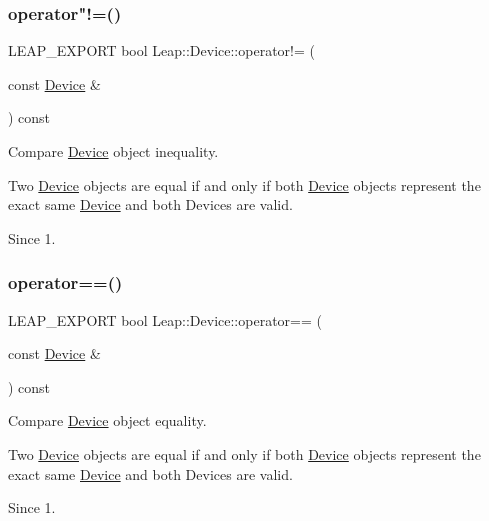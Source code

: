 \subsubsection{\texorpdfstring{operator"!=()}{operator!=()}}
{\footnotesize\ttfamily L\+E\+A\+P\+\_\+\+E\+X\+P\+O\+RT bool Leap\+::\+Device\+::operator!= (\begin{DoxyParamCaption}\item[{const \hyperlink{class_leap_1_1_device}{Device} \&}]{ }\end{DoxyParamCaption}) const}

Compare \hyperlink{class_leap_1_1_device}{Device} object inequality.


\begin{DoxyCodeInclude}
\end{DoxyCodeInclude}


Two \hyperlink{class_leap_1_1_device}{Device} objects are equal if and only if both \hyperlink{class_leap_1_1_device}{Device} objects represent the exact same \hyperlink{class_leap_1_1_device}{Device} and both Devices are valid. \begin{DoxySince}{Since}
1. 
\end{DoxySince}
\mbox{\label{class_leap_1_1_device_a38a95c6aa2b58719e4202eb8e6e2051d}} 
\subsubsection{\texorpdfstring{operator==()}{operator==()}}
{\footnotesize\ttfamily L\+E\+A\+P\+\_\+\+E\+X\+P\+O\+RT bool Leap\+::\+Device\+::operator== (\begin{DoxyParamCaption}\item[{const \hyperlink{class_leap_1_1_device}{Device} \&}]{ }\end{DoxyParamCaption}) const}

Compare \hyperlink{class_leap_1_1_device}{Device} object equality.


\begin{DoxyCodeInclude}
\end{DoxyCodeInclude}


Two \hyperlink{class_leap_1_1_device}{Device} objects are equal if and only if both \hyperlink{class_leap_1_1_device}{Device} objects represent the exact same \hyperlink{class_leap_1_1_device}{Device} and both Devices are valid. \begin{DoxySince}{Since}
1. 
\end{DoxySince}
\mbox{\label{class_leap_1_1_device_a700dd78b7ef8e74695886e510ff43f13}} 
